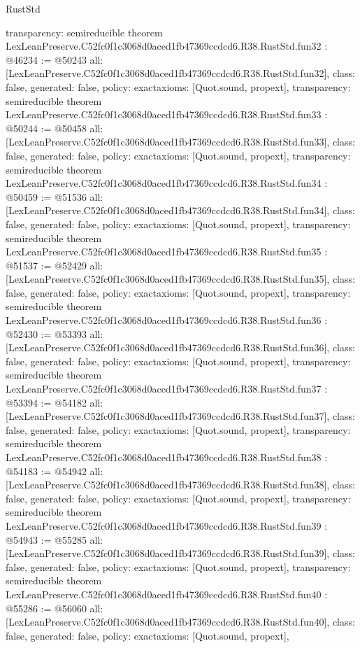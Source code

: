 \begin{lexlean}{RustStd}
\begin{coremodule}
{  transparency: semireducible
}
theorem LexLeanPreserve.C52fc0f1c3068d0aced1fb47369ccdcd6.R38.RustStd.fun32 : @46234 := @50243 {
  all: [LexLeanPreserve.C52fc0f1c3068d0aced1fb47369ccdcd6.R38.RustStd.fun32],
  class: false,
  generated: false,
  policy: exact{axioms: [Quot.sound, propext]},
  transparency: semireducible
}
theorem LexLeanPreserve.C52fc0f1c3068d0aced1fb47369ccdcd6.R38.RustStd.fun33 : @50244 := @50458 {
  all: [LexLeanPreserve.C52fc0f1c3068d0aced1fb47369ccdcd6.R38.RustStd.fun33],
  class: false,
  generated: false,
  policy: exact{axioms: [Quot.sound, propext]},
  transparency: semireducible
}
theorem LexLeanPreserve.C52fc0f1c3068d0aced1fb47369ccdcd6.R38.RustStd.fun34 : @50459 := @51536 {
  all: [LexLeanPreserve.C52fc0f1c3068d0aced1fb47369ccdcd6.R38.RustStd.fun34],
  class: false,
  generated: false,
  policy: exact{axioms: [Quot.sound, propext]},
  transparency: semireducible
}
theorem LexLeanPreserve.C52fc0f1c3068d0aced1fb47369ccdcd6.R38.RustStd.fun35 : @51537 := @52429 {
  all: [LexLeanPreserve.C52fc0f1c3068d0aced1fb47369ccdcd6.R38.RustStd.fun35],
  class: false,
  generated: false,
  policy: exact{axioms: [Quot.sound, propext]},
  transparency: semireducible
}
theorem LexLeanPreserve.C52fc0f1c3068d0aced1fb47369ccdcd6.R38.RustStd.fun36 : @52430 := @53393 {
  all: [LexLeanPreserve.C52fc0f1c3068d0aced1fb47369ccdcd6.R38.RustStd.fun36],
  class: false,
  generated: false,
  policy: exact{axioms: [Quot.sound, propext]},
  transparency: semireducible
}
theorem LexLeanPreserve.C52fc0f1c3068d0aced1fb47369ccdcd6.R38.RustStd.fun37 : @53394 := @54182 {
  all: [LexLeanPreserve.C52fc0f1c3068d0aced1fb47369ccdcd6.R38.RustStd.fun37],
  class: false,
  generated: false,
  policy: exact{axioms: [Quot.sound, propext]},
  transparency: semireducible
}
theorem LexLeanPreserve.C52fc0f1c3068d0aced1fb47369ccdcd6.R38.RustStd.fun38 : @54183 := @54942 {
  all: [LexLeanPreserve.C52fc0f1c3068d0aced1fb47369ccdcd6.R38.RustStd.fun38],
  class: false,
  generated: false,
  policy: exact{axioms: [Quot.sound, propext]},
  transparency: semireducible
}
theorem LexLeanPreserve.C52fc0f1c3068d0aced1fb47369ccdcd6.R38.RustStd.fun39 : @54943 := @55285 {
  all: [LexLeanPreserve.C52fc0f1c3068d0aced1fb47369ccdcd6.R38.RustStd.fun39],
  class: false,
  generated: false,
  policy: exact{axioms: [Quot.sound, propext]},
  transparency: semireducible
}
theorem LexLeanPreserve.C52fc0f1c3068d0aced1fb47369ccdcd6.R38.RustStd.fun40 : @55286 := @56060 {
  all: [LexLeanPreserve.C52fc0f1c3068d0aced1fb47369ccdcd6.R38.RustStd.fun40],
  class: false,
  generated: false,
  policy: exact{axioms: [Quot.sound, propext]},
}
\end{coremodule}
\end{lexlean}
